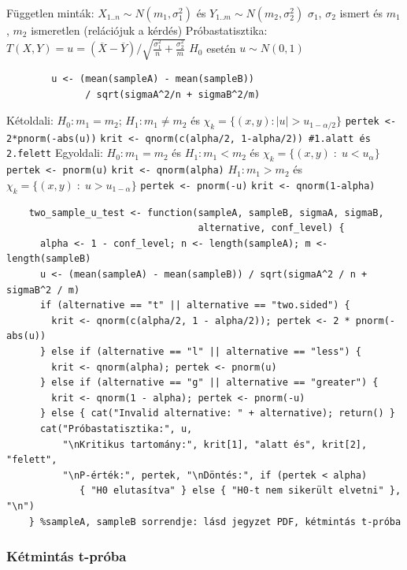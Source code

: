 \documentclass[12pt,a4paper]{article}
\begin{document}
\begin{outline}
	\1 Független minták: $X_{1..n} \sim N(m_1, \sigma_1^2)$ és $Y_{1..m} \sim N(m_2, \sigma_2^2)$
		\2 $\sigma_1$, $\sigma_2$ ismert és $m_1$, $m_2$ ismeretlen (relációjuk a kérdés)
	\1 Próbastatisztika: $T(X,Y) = u = (\overline{X} - \overline{Y}) / \sqrt{\frac{\sigma_1^2}{n} + \frac{\sigma_2^2}{m}}$
		\2 $H_0$ esetén $u \sim N(0,1)$
		\2 \begin{verbatim}
		u <- (mean(sampleA) - mean(sampleB))
		      / sqrt(sigmaA^2/n + sigmaB^2/m)
		\end{verbatim}
	\1 Kétoldali: $H_0: m_1 = m_2$; $H_1: m_1 \ne m_2$
	és $\chi_k = \{ (x,y) : |u| > u_{1-\alpha/2} \}$
		\2 \texttt{pertek <- 2*pnorm(-abs(u))}
		\2 \texttt{krit <- qnorm(c(alpha/2, 1-alpha/2)) \#1.alatt és 2.felett}
	\1 Egyoldali: $H_0: m_1 = m_2$ és 
		\2 $H_1: m_1 < m_2$ és $\chi_k = \{ (x,y) \;:\; u < u_{\alpha} \}$
			\3 \texttt{pertek <- pnorm(u)}
			\3 \texttt{krit <- qnorm(alpha)}
		\2 $H_1: m_1 > m_2$ és $\chi_k = \{ (x,y) \;:\; u > u_{1-\alpha} \}$
			\3 \texttt{pertek <- pnorm(-u)}
			\3 \texttt{krit <- qnorm(1-alpha)}
	\1 \begin{verbatim}
	two_sample_u_test <- function(sampleA, sampleB, sigmaA, sigmaB,
	                              alternative, conf_level) {
	  alpha <- 1 - conf_level; n <- length(sampleA); m <- length(sampleB)
	  u <- (mean(sampleA) - mean(sampleB)) / sqrt(sigmaA^2 / n + sigmaB^2 / m)
	  if (alternative == "t" || alternative == "two.sided") {
	    krit <- qnorm(c(alpha/2, 1 - alpha/2)); pertek <- 2 * pnorm(-abs(u))
	  } else if (alternative == "l" || alternative == "less") {
	    krit <- qnorm(alpha); pertek <- pnorm(u)
	  } else if (alternative == "g" || alternative == "greater") {
	    krit <- qnorm(1 - alpha); pertek <- pnorm(-u)
	  } else { cat("Invalid alternative: " + alternative); return() }
	  cat("Próbastatisztika:", u,
	      "\nKritikus tartomány:", krit[1], "alatt és", krit[2], "felett",
	      "\nP-érték:", pertek, "\nDöntés:", if (pertek < alpha)
	         { "H0 elutasítva" } else { "H0-t nem sikerült elvetni" }, "\n")
	} %sampleA, sampleB sorrendje: lásd jegyzet PDF, kétmintás t-próba
	\end{verbatim}
\end{outline}

\pagebreak

\subsubsection{Kétmintás t-próba}
\label{sec:próba-2minta-t}
\end{document}
